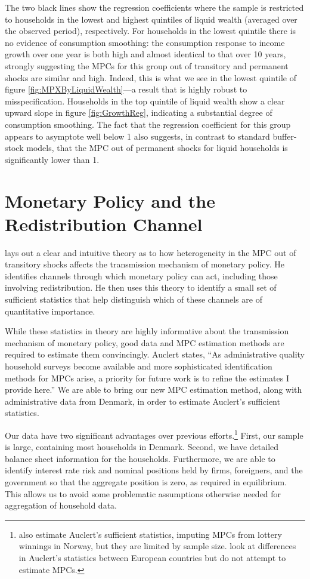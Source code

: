 \documentclass[titlepage]{\econtex}\newcommand{\texname}{ConsumptionHeterogeneity}
\begin{document}
	The two black lines show the regression coefficients where the sample is restricted to households in the lowest and highest quintiles of liquid wealth (averaged over the observed period), respectively. For households in the lowest quintile there is no evidence of consumption smoothing: the consumption response to income growth over one year is both high and almost identical to that over 10 years, strongly suggesting the MPCs for this group out of transitory and permanent shocks are similar and high. Indeed, this is what we see in the lowest quintile of figure \ref{fig:MPXByLiquidWealth}---a result that is highly robust to misspecification. Households in the top quintile of liquid wealth show a clear upward slope in figure \ref{fig:GrowthReg}, indicating a substantial degree of consumption smoothing. The fact that the regression coefficient for this group appears to asymptote well below 1 also suggests, in contrast to standard buffer-stock models, that the MPC out of permanent shocks for liquid households is significantly lower than 1.
	
	\section{Monetary Policy and the Redistribution Channel} \label{monetary_policy}
	\cite{auclert_monetary_2017} lays out a clear and intuitive theory as to how heterogeneity in the MPC out of transitory shocks affects the transmission mechanism of monetary policy. He identifies channels through which monetary policy can act, including those involving redistribution. He then uses this theory to identify a small set of sufficient statistics that help distinguish which of these channels are of quantitative importance.
	
	While these statistics in theory are highly informative about the transmission mechanism of monetary policy, good data and MPC estimation methods are required to estimate them convincingly. Auclert states, ``As administrative quality household surveys become available and more sophisticated identification methods for MPCs arise, a priority for future work is to refine the estimates I provide here.'' We are able to bring our new MPC estimation method, along with administrative data from Denmark, in order to estimate Auclert's sufficient statistics.
	
	Our data have two significant advantages over previous efforts.\footnote{\cite{fagereng_mpc_2016} also estimate Auclert's sufficient statistics, imputing MPCs from lottery winnings in Norway, but they are limited by sample size. \cite{ampudia_monetary_2018} look at differences in Auclert's statistics between European countries but do not attempt to estimate MPCs.} First, our sample is large, containing most households in Denmark. Second, we have detailed balance sheet information for the households. Furthermore, we are able to identify interest rate risk and nominal positions held by firms, foreigners, and the government so that the aggregate position is zero, as required in equilibrium. This allows us to avoid some problematic assumptions otherwise needed for aggregation of household data.
	
\end{document}
